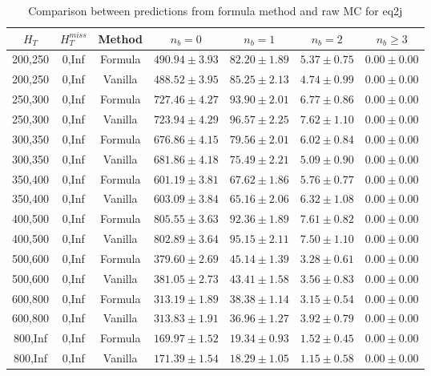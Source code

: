 \begin{longtable}{ | c | c | c | c | c | c | c | }
\caption{Comparison between predictions from formula method and raw MC for eq2j} \label{tab:formula-eq2j} \\    \hline 
$H_{T}$ & $H_{T}^{miss}$ & Method & $n_{b} = 0$ & $n_{b} = 1$ & $n_{b} = 2$ & $n_{b} \ge 3$ \\ \hline200,250 & 0,Inf & Formula  & $   490.94 \pm  3.93 $ & $    82.20 \pm  1.89 $ & $     5.37 \pm  0.75 $ & $     0.00 \pm  0.00 $  \\  
200,250 & 0,Inf & Vanilla  & $   488.52 \pm  3.95 $ & $    85.25 \pm  2.13 $ & $     4.74 \pm  0.99 $ & $     0.00 \pm  0.00 $  \\ \hline 
250,300 & 0,Inf & Formula  & $   727.46 \pm  4.27 $ & $    93.90 \pm  2.01 $ & $     6.77 \pm  0.86 $ & $     0.00 \pm  0.00 $  \\  
250,300 & 0,Inf & Vanilla  & $   723.94 \pm  4.29 $ & $    96.57 \pm  2.25 $ & $     7.62 \pm  1.10 $ & $     0.00 \pm  0.00 $  \\ \hline 
300,350 & 0,Inf & Formula  & $   676.86 \pm  4.15 $ & $    79.56 \pm  2.01 $ & $     6.02 \pm  0.84 $ & $     0.00 \pm  0.00 $  \\  
300,350 & 0,Inf & Vanilla  & $   681.86 \pm  4.18 $ & $    75.49 \pm  2.21 $ & $     5.09 \pm  0.90 $ & $     0.00 \pm  0.00 $  \\ \hline 
350,400 & 0,Inf & Formula  & $   601.19 \pm  3.81 $ & $    67.62 \pm  1.86 $ & $     5.76 \pm  0.77 $ & $     0.00 \pm  0.00 $  \\  
350,400 & 0,Inf & Vanilla  & $   603.09 \pm  3.84 $ & $    65.16 \pm  2.06 $ & $     6.32 \pm  1.08 $ & $     0.00 \pm  0.00 $  \\ \hline 
400,500 & 0,Inf & Formula  & $   805.55 \pm  3.63 $ & $    92.36 \pm  1.89 $ & $     7.61 \pm  0.82 $ & $     0.00 \pm  0.00 $  \\  
400,500 & 0,Inf & Vanilla  & $   802.89 \pm  3.64 $ & $    95.15 \pm  2.11 $ & $     7.50 \pm  1.10 $ & $     0.00 \pm  0.00 $  \\ \hline 
500,600 & 0,Inf & Formula  & $   379.60 \pm  2.69 $ & $    45.14 \pm  1.39 $ & $     3.28 \pm  0.61 $ & $     0.00 \pm  0.00 $  \\  
500,600 & 0,Inf & Vanilla  & $   381.05 \pm  2.73 $ & $    43.41 \pm  1.58 $ & $     3.56 \pm  0.83 $ & $     0.00 \pm  0.00 $  \\ \hline 
600,800 & 0,Inf & Formula  & $   313.19 \pm  1.89 $ & $    38.38 \pm  1.14 $ & $     3.15 \pm  0.54 $ & $     0.00 \pm  0.00 $  \\  
600,800 & 0,Inf & Vanilla  & $   313.83 \pm  1.91 $ & $    36.96 \pm  1.27 $ & $     3.92 \pm  0.79 $ & $     0.00 \pm  0.00 $  \\ \hline 
800,Inf & 0,Inf & Formula  & $   169.97 \pm  1.52 $ & $    19.34 \pm  0.93 $ & $     1.52 \pm  0.45 $ & $     0.00 \pm  0.00 $  \\  
800,Inf & 0,Inf & Vanilla  & $   171.39 \pm  1.54 $ & $    18.29 \pm  1.05 $ & $     1.15 \pm  0.58 $ & $     0.00 \pm  0.00 $  \\ \hline 
    \hline 
    \hline 
\end{longtable}
